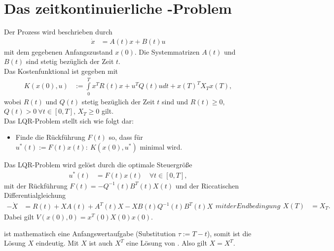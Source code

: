 \section{Das zeitkontinuierliche -Problem}
Der Prozess wird beschrieben durch
\begin{align}
	\dot{x} & = A(t)x + B(t)u
\end{align}
mit dem gegebenen Anfangszustand $x(0)$. Die Systemmatrizen $A(t)$ und $B(t)$ sind stetig bezüglich der Zeit $t$.\\
Das Kostenfunktional ist gegeben mit
\begin{align}
	K\left(x(0),u \right) & := \int\limits_0^T x^TR(t)x + u^TQ(t)u dt + x(T)^TX_Tx(T),
\end{align} 
wobei $R(t)$ und $Q(t)$ stetig bezüglich der Zeit $t$ sind und $R(t)\geq 0$, $Q(t)>0\ \forall t\in[0,T]$, $X_T\geq 0$ gilt.\\
Das \ac{LQR}-Problem stellt sich wie folgt dar:
\begin{itemize}
  \item[] Finde die Rückführung $F(t)$ so, dass für $u^{\ast}(t):=F(t)x(t):\ K\left(x(0),u^{\ast} \right)$ minimal wird. 
\end{itemize}
\begin{satz}
Das \ac{LQR}-Problem wird gelöst durch die optimale Steuergröße
\begin{align}
	u^{\ast}(t) & = F(t)x(t)\quad \forall t\in[0,T],
\end{align}
mit der Rückführung $F(t)=-Q^{-1}(t)B^T(t)X(t)$ und der Riccatischen Differentialgleichung
\begin{subequations}\label{eqn:kap_3_riccatischedgl}
\begin{align}
	-\dot{X} & = R(t)+X A(t)+A^T(t)X-XB(t)Q^{-1}(t)B^T(t)X
\end{align}
mit der Endbedingung
\begin{align}
	X(T) & = X_T.
\end{align}
\end{subequations}
Dabei gilt $V\left(x(0),0 \right) = x^T(0)X(0)x(0)$.
\end{satz}
\begin{remark}
 ist mathematisch eine Anfangswertaufgabe (Substitution $\tau:=T-t$), somit ist die Lösung $X$ eindeutig. Mit $X$ ist auch $X^T$ eine Lösung von
. Also gilt $X=X^T$.
\end{remark}
